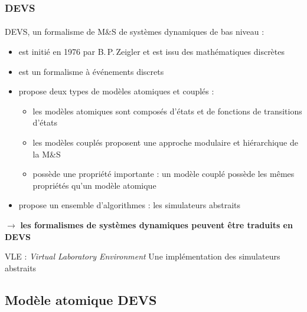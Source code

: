 \documentclass[xetex, compress, table, dvipsnames]{beamer}
\begin{document}
\begin{frame}
  \frametitle{DEVS}
  \framesubtitle{}
  \begin{exampleblock}{DEVS, un formalisme de M\&S de systèmes
      dynamiques de bas niveau :}
    \begin{itemize}
    \item est initié en 1976 par B.\,P.\,Zeigler et est issu des
      \alert{mathématiques discrètes}
    \item est un formalisme à \alert{événements discrets}
    \item propose deux types de modèles \alert{atomiques} et
      \alert{couplés} :
      \begin{itemize}
      \item les modèles atomiques sont composés d'\alert{états}
        et de fonctions de \alert{transitions} d'états
      \item les modèles couplés proposent une approche
        \alert{modulaire} et \alert{hiérarchique} de la M\&S
      \item possède une propriété importante : un modèle couplé
        possède les mêmes propriétés qu'un modèle atomique
      \end{itemize}
    \item propose un \alert{ensemble d'algorithmes} : les
      simulateurs abstraits
    \end{itemize}
    \pause

    $\rightarrow$ \alert{\textbf{les formalismes de systèmes dynamiques
        peuvent être traduits en DEVS}}
  \end{exampleblock}
  \pause
  \begin{alertblock}{VLE : \textit{Virtual Laboratory Environment}}
    Une implémentation des simulateurs abstraits
  \end{alertblock}
\end{frame}

\subsection{Modèle atomique DEVS}
\end{document}
